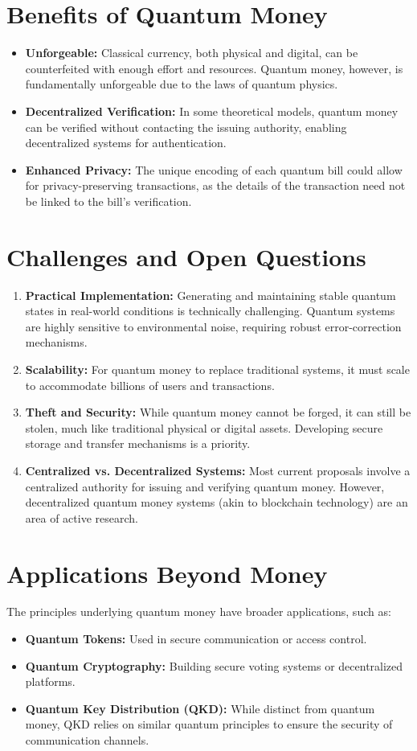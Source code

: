 \documentclass[11pt]{article}
\theoremstyle{definition}
\begin{document}
\section*{Benefits of Quantum Money}
\begin{itemize}
    \item \textbf{Unforgeable:} Classical currency, both physical and digital, can be counterfeited with enough effort and resources. Quantum money, however, is fundamentally unforgeable due to the laws of quantum physics.
    \item \textbf{Decentralized Verification:} In some theoretical models, quantum money can be verified without contacting the issuing authority, enabling decentralized systems for authentication.
    \item \textbf{Enhanced Privacy:} The unique encoding of each quantum bill could allow for privacy-preserving transactions, as the details of the transaction need not be linked to the bill's verification.
\end{itemize}

\section*{Challenges and Open Questions}
\begin{enumerate}
    \item \textbf{Practical Implementation:} Generating and maintaining stable quantum states in real-world conditions is technically challenging. Quantum systems are highly sensitive to environmental noise, requiring robust error-correction mechanisms.
    \item \textbf{Scalability:} For quantum money to replace traditional systems, it must scale to accommodate billions of users and transactions.
    \item \textbf{Theft and Security:} While quantum money cannot be forged, it can still be stolen, much like traditional physical or digital assets. Developing secure storage and transfer mechanisms is a priority.
    \item \textbf{Centralized vs. Decentralized Systems:} Most current proposals involve a centralized authority for issuing and verifying quantum money. However, decentralized quantum money systems (akin to blockchain technology) are an area of active research.
\end{enumerate}

\section*{Applications Beyond Money}
The principles underlying quantum money have broader applications, such as:
\begin{itemize}
    \item \textbf{Quantum Tokens:} Used in secure communication or access control.
    \item \textbf{Quantum Cryptography:} Building secure voting systems or decentralized platforms.
    \item \textbf{Quantum Key Distribution (QKD):} While distinct from quantum money, QKD relies on similar quantum principles to ensure the security of communication channels.
\end{itemize}
\end{document}
